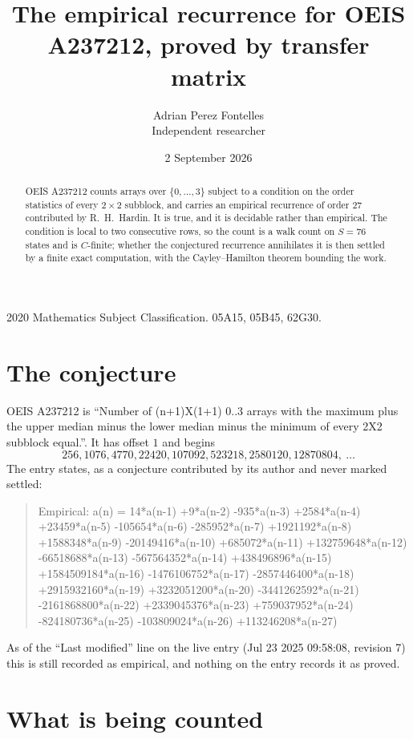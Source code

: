 \documentclass[11pt,a4paper]{article}
\title{The empirical recurrence for OEIS A237212, proved by transfer matrix}
\author{Adrian Perez Fontelles\\ \small Independent researcher}
\date{2 September 2026}
\theoremstyle{plain}
\theoremstyle{definition}
\begin{document}
\maketitle

\begin{abstract}
OEIS A237212 counts arrays over $\{0,\dots,3\}$ subject to a condition on the order
statistics of every $2\times2$ subblock, and carries an empirical recurrence of order
$27$ contributed by R.~H.~Hardin. It is true, and it is decidable rather than empirical.
The condition is local to two consecutive rows, so the count is a walk count on $S=76$
states and is $C$-finite; whether the conjectured recurrence annihilates it is then settled by
a finite exact computation, with the Cayley--Hamilton theorem bounding the work.
\end{abstract}

\noindent\small 2020 Mathematics Subject Classification. 05A15, 05B45, 62G30.\normalsize

\section{The conjecture}

OEIS A237212 is ``Number of (n+1)X(1+1) 0..3 arrays with the maximum plus the upper median minus the lower median minus the minimum of every 2X2 subblock equal.''. It has offset $1$ and begins
\[
256, 1076, 4770, 22420, 107092, 523218, 2580120, 12870804,\ \dots
\]
The entry states, as a conjecture contributed by its author and never marked settled:
\begin{quote}
Empirical: a(n) = 14*a(n-1) +9*a(n-2) -935*a(n-3) +2584*a(n-4) +23459*a(n-5) -105654*a(n-6) -285952*a(n-7) +1921192*a(n-8) +1588348*a(n-9) -20149416*a(n-10) +685072*a(n-11) +132759648*a(n-12) -66518688*a(n-13) -567564352*a(n-14) +438496896*a(n-15) +1584509184*a(n-16) -1476106752*a(n-17) -2857446400*a(n-18) +2915932160*a(n-19) +3232051200*a(n-20) -3441262592*a(n-21) -2161868800*a(n-22) +2339045376*a(n-23) +759037952*a(n-24) -824180736*a(n-25) -103809024*a(n-26) +113246208*a(n-27)
\end{quote}
As of the ``Last modified'' line on the live entry (Jul 23 2025 09:58:08, revision 7) this is still
recorded as empirical, and nothing on the entry records it as proved.

\section{What is being counted}
\end{document}
